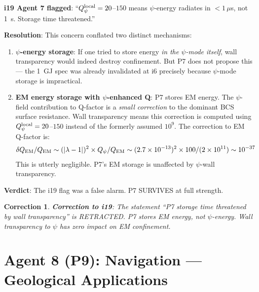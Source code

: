 \documentclass[11pt]{article}
\newcommand{\ee}[1]{\times 10^{#1}}
\newcommand{\lbone}{|\lambda - 1|}
\newcommand{\Qpsi}{Q_\psi}
\newtheorem{correction}[theorem]{Correction}
\theoremstyle{remark}
\begin{document}
\begin{newbox}
\textbf{i19 Agent 7 flagged}: ``$\Qpsi^{\rm local} = 20$--$150$ means $\psi$-energy
radiates in $<1\,\mu$s, not 1~s. Storage time threatened.''

\textbf{Resolution}: This concern conflated two distinct mechanisms:
\begin{enumerate}
\item \textbf{$\psi$-energy storage}: If one tried to store energy \emph{in the $\psi$-mode
  itself}, wall transparency would indeed destroy confinement. But P7 does not propose
  this --- the 1~GJ spec was already invalidated at i6 precisely because $\psi$-mode
  storage is impractical.
\item \textbf{EM energy storage with $\psi$-enhanced Q}: P7 stores EM energy. The
  $\psi$-field contribution to Q-factor is a \emph{small correction} to the dominant
  BCS surface resistance. Wall transparency means this correction is computed using
  $\Qpsi^{\rm local} = 20$--$150$ instead of the formerly assumed $10^9$. The correction
  to EM Q-factor is:
  \[
    \delta Q_{\rm EM}/Q_{\rm EM} \sim (\lbone)^2 \times \Qpsi / Q_{\rm EM} \sim
    (2.7\ee{-13})^2 \times 100 / (2\ee{11}) \sim 10^{-37}
  \]
  This is utterly negligible. P7's EM storage is unaffected by $\psi$-wall transparency.
\end{enumerate}
\textbf{Verdict}: The i19 flag was a false alarm. P7 SURVIVES at full strength.
\end{newbox}

\begin{correction}
\textbf{Correction to i19}: The statement ``P7 storage time threatened by wall
transparency'' is RETRACTED. P7 stores EM energy, not $\psi$-energy. Wall transparency
to $\psi$ has zero impact on EM confinement.
\end{correction}

\newpage
\section{Agent 8 (P9): Navigation --- Geological Applications}
\label{sec:agent8}
\end{document}
